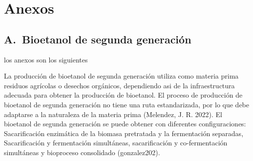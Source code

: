 \documentclass[12pt]{article}
\begin{document}
			
		
		\newpage
	

 

\newpage




		
\section*{Anexos}		
		
\setcounter{anexo}{0}

\subsection*{A.\theanexo\ Bioetanol de segunda generación}
	

		los anexos son los siguientes
		\label{marco conceptual}
		
		
		
		La producción de bioetanol de segunda generación utiliza como materia prima residuos agrícolas o desechos orgánicos, dependiendo asi de la infraestructura adecuada para obtener la producción de bioetanol. El proceso de producción de bioetanol de segunda generación no tiene una ruta estandarizada, por lo que debe adaptarse a la naturaleza de la materia prima \cite{melendez2022biotecnologia} (Melendez, J. R. 2022). El bioetanol de segunda generación se puede obtener con diferentes configuraciones: Sacarificación enzimática de la biomasa pretratada y la fermentación separadas, Sacarificación y fermentación simultáneas, sacarificación y co-fermentación simultáneas y bioproceso consolidado (gonzalez202).
		
\end{document}

